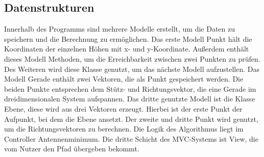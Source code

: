 \subsection{Datenstrukturen}\label{subsec:datenstrukt}
Innerhalb des Programms sind mehrere Modelle erstellt, um die Daten zu speichern und die Berechnung zu ermöglichen.
Das erste Modell Punkt hält die Koordinaten der einzelnen Höhen mit x- und y-Koordinate.
Außerdem enthält dieses Modell Methoden, um die Erreichbarkeit zwischen zwei Punkten zu prüfen.
Des Weiteren wird diese Klasse genutzt, um das nächste Modell aufzustellen.
Das Modell Gerade enthält zwei Vektoren, die als Punkt gespeichert werden.
Die beiden Punkte entsprechen dem Stütz- und Richtungsvektor, die eine Gerade im dreidimensionalen System aufspannen.
Das dritte genutzte Modell ist die Klasse Ebene, diese wird aus drei Vektoren erzeugt.
Hierbei ist der erste Punkt der Aufpunkt, bei dem die Ebene ansetzt.
Der zweite und dritte Punkt wird genutzt, um die Richtungsvektoren zu berechnen.
Die Logik des Algorithmus liegt im Controller Antennenminimum.
Die dritte Schicht des MVC-Systems ist View, die vom Nutzer den Pfad übergeben bekommt.